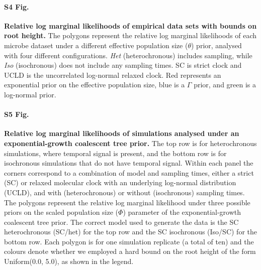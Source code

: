 \documentclass[10pt,letterpaper]{article}
\begin{document}
\paragraph*{S4 Fig.}
\label{S4_Fig}
	\textbf{Relative log marginal likelihoods of empirical data sets with bounds on root height.} The polygons represent the relative log marginal likelihoods of each microbe dataset under a different effective population size ($\theta$) prior, analysed with four different configurations. \textit{Het} (heterochronous) includes sampling, while \textit{Iso} (isochronous) does not include any sampling times. SC is strict clock and UCLD is the uncorrelated log-normal relaxed clock. Red represents an exponential prior on the effective population size, blue is a $\Gamma$ prior, and green is a log-normal prior.

\paragraph*{S5 Fig.}
\label{S5_Fig}
	{\textbf{Relative log marginal likelihoods of simulations analysed under an exponential-growth coalescent tree prior.} The top row is for heterochronous simulations, where temporal signal is present, and the bottom row is for isochronous simulations that do not have temporal signal. Within each panel the		corners correspond to a combination of model and sampling times, either a strict (SC) or relaxed molecular clock with an underlying log-normal distribution (UCLD), and with (heterochronous) or without (isochronous) sampling times. The polygons represent the relative log marginal likelihood under three possible priors on the scaled population size ($\Phi$) parameter of the exponential-growth coalescent tree prior. The correct model used to generate the data is the SC heterochronous (SC/het) for the top row and the SC isochronous (Iso/SC) for the bottom row. Each polygon is for one simulation replicate (a total of ten) and the colours denote whether we employed a hard bound on the root height of the form Uniform(0.0, 5.0), as shown in the legend.}

\end{document}
